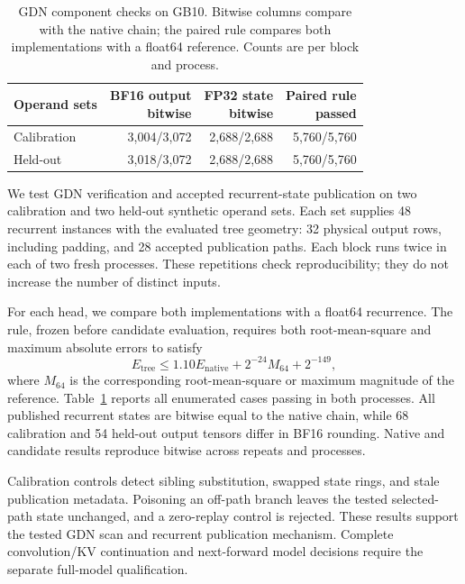\begin{table}[t]
\centering
\caption{GDN component checks on GB10. Bitwise columns compare with the native chain; the paired rule compares both implementations with a float64 reference. Counts are per block and process.}
\label{tab:gdn-component}
\small
\setlength{\tabcolsep}{3pt}
\begin{tabular}{@{}lrrr@{}}
\toprule
Operand sets & \shortstack{BF16 output\\bitwise} & \shortstack{FP32 state\\bitwise} & \shortstack{Paired rule\\passed} \\
\midrule
Calibration & 3,004/3,072 & 2,688/2,688 & 5,760/5,760 \\
Held-out & 3,018/3,072 & 2,688/2,688 & 5,760/5,760 \\
\bottomrule
\end{tabular}
\end{table}

We test GDN verification and accepted recurrent-state publication on two calibration and two held-out synthetic operand sets. Each set supplies 48 recurrent instances with the evaluated tree geometry: 32 physical output rows, including padding, and 28 accepted publication paths. Each block runs twice in each of two fresh processes. These repetitions check reproducibility; they do not increase the number of distinct inputs.

For each head, we compare both implementations with a float64 recurrence. The rule, frozen before candidate evaluation, requires both root-mean-square and maximum absolute errors to satisfy
\begin{equation}
 E_{\mathrm{tree}} \leq 1.10 E_{\mathrm{native}} + 2^{-24} M_{64} + 2^{-149},
\end{equation}
where $M_{64}$ is the corresponding root-mean-square or maximum magnitude of the reference. Table~\ref{tab:gdn-component} reports all enumerated cases passing in both processes. All published recurrent states are bitwise equal to the native chain, while 68 calibration and 54 held-out output tensors differ in BF16 rounding. Native and candidate results reproduce bitwise across repeats and processes.

Calibration controls detect sibling substitution, swapped state rings, and stale publication metadata. Poisoning an off-path branch leaves the tested selected-path state unchanged, and a zero-replay control is rejected. These results support the tested GDN scan and recurrent publication mechanism. Complete convolution/KV continuation and next-forward model decisions require the separate full-model qualification.
